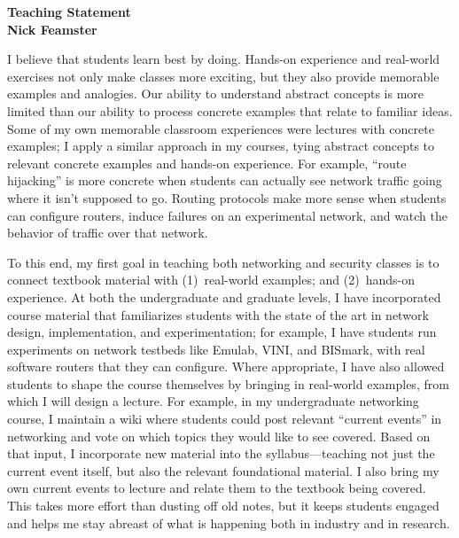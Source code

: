 \newpage \setcounter{page}{1}

\begin{center}
{\Large\textbf{Teaching Statement}}\\[0.1in] {\large\textbf{Nick
Feamster}}\\
\end{center}
I believe that students learn best by doing.  Hands-on experience and
real-world exercises not only make classes more exciting, but they
also provide memorable examples and analogies.  Our ability to
understand abstract concepts is more limited than our ability to process
concrete examples that relate to familiar ideas.  Some of
my own memorable classroom experiences were lectures with concrete
examples; I apply a similar approach in my courses, tying abstract
concepts to relevant concrete examples and hands-on experience.  For
example, ``route hijacking'' is more concrete when students can
actually see network traffic going where it isn't supposed to go.
Routing protocols make more sense when students can configure routers,
induce failures on an experimental network, and watch the behavior of
traffic over that network.

To this end, my first goal in teaching both networking and security
classes is to connect textbook material with (1)~real-world examples;
and (2)~hands-on experience.  At both the undergraduate and graduate
levels, I have incorporated course material that familiarizes students
with the state of the art in network design, implementation, and
experimentation; for example, I have students run experiments on network
testbeds like Emulab, VINI, and BISmark, with real software routers that
they can configure.  Where appropriate, I have also allowed students to
shape the course themselves by bringing in real-world examples, from
which I will design a lecture.  For example, in my undergraduate
networking course, I maintain a wiki where students could post relevant
``current events'' in networking and vote on which topics they would
like to see covered.  Based on that input, I incorporate new material
into the syllabus---teaching not just the current event itself, but also
the relevant foundational material.  I also bring my own current events
to lecture and relate them to the textbook being covered.  This takes
more effort than dusting off old notes, but it keeps students engaged
and helps me stay abreast of what is happening both in industry and in
research.

